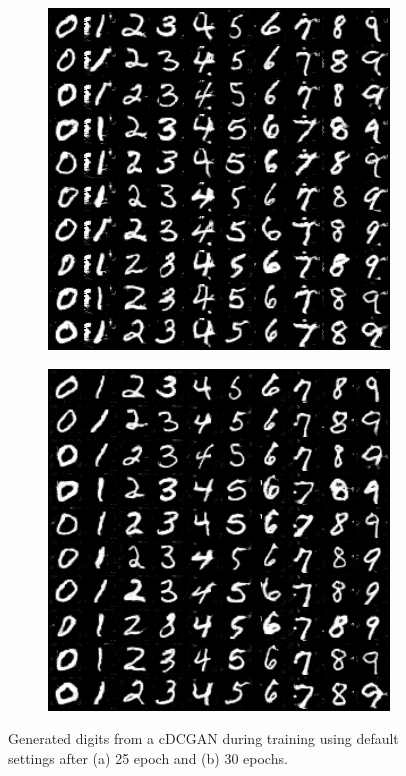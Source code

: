 \begin{figure}[H]
    \centering

    \begin{subfigure}{0.2\textwidth}
        \centering
        \includegraphics[width=0.95\linewidth]{cDCGAN/fake_sample_epoch_0025.png}
        \caption{}
        \label{subfig:cDCGAN/fake_sample_epoch_0025}
    \end{subfigure}%
    \begin{subfigure}{0.2\textwidth}
        \centering
        \includegraphics[width=0.95\linewidth]{cDCGAN/fake_sample_epoch_0030.png}
        \caption{}
        \label{subfig:cDCGAN/fake_sample_epoch_0030}
    \end{subfigure}%

    \caption{Generated digits from a cDCGAN during training using default settings after (a) 25 epoch and (b) 30 epochs.}
    \label{fig:cDCGAN_longer}
\end{figure}

